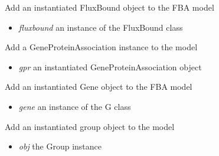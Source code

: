 \documentclass[a4paper,11pt,english]{sphinxmanual}
\begin{document}
\begin{fulllineitems}
\begin{fulllineitems}
\label{modules_doc:cbmpy.CBModel.Model.addFluxBound}
Add an instantiated FluxBound object to the FBA model
\begin{itemize}
\item {} 
\emph{fluxbound} an instance of the FluxBound class

\end{itemize}

\end{fulllineitems}


\begin{fulllineitems}
\label{modules_doc:cbmpy.CBModel.Model.addGPRAssociation}
Add a GeneProteinAssociation instance to the model
\begin{itemize}
\item {} 
\emph{gpr} an instantiated GeneProteinAssociation object

\end{itemize}

\end{fulllineitems}


\begin{fulllineitems}
\label{modules_doc:cbmpy.CBModel.Model.addGene}
Add an instantiated Gene object to the FBA model
\begin{itemize}
\item {} 
\emph{gene} an instance of the G class

\end{itemize}

\end{fulllineitems}


\begin{fulllineitems}
\label{modules_doc:cbmpy.CBModel.Model.addGroup}
Add an instantiated group object to the model
\begin{itemize}
\item {} 
\emph{obj} the Group instance


\end{itemize}
\end{fulllineitems}
\end{fulllineitems}
\end{document}
